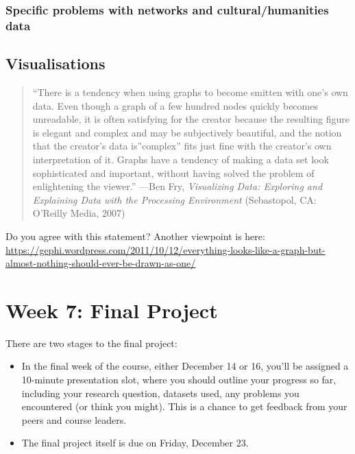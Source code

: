 \documentclass[
]{book}
\begin{document}
\hypertarget{specific-problems-with-networks-and-culturalhumanities-data}{%
\subsection{Specific problems with networks and cultural/humanities data}\label{specific-problems-with-networks-and-culturalhumanities-data}}

\hypertarget{visualisations}{%
\section{Visualisations}\label{visualisations}}

\begin{quote}
``There is a tendency when using graphs to become smitten with one's own data. Even though a graph of a few hundred nodes quickly becomes unreadable, it is often satisfying for the creator because the resulting figure is elegant and complex and may be subjectively beautiful, and the notion that the creator's data is''complex'' fits just fine with the creator's own interpretation of it. Graphs have a tendency of making a data set look sophisticated and important, without having solved the problem of enlightening the viewer.'' ---Ben Fry, \emph{Visualizing Data: Exploring and Explaining Data with the Processing Environment} (Sebastopol, CA: O'Reilly Media, 2007)
\end{quote}

Do you agree with this statement? Another viewpoint is here: \url{https://gephi.wordpress.com/2011/10/12/everything-looks-like-a-graph-but-almost-nothing-should-ever-be-drawn-as-one/}

\hypertarget{week-7-final-project}{%
\chapter{Week 7: Final Project}\label{week-7-final-project}}

There are two stages to the final project:

\begin{itemize}
\item
  In the final week of the course, either December 14 or 16, you'll be assigned a 10-minute presentation slot, where you should outline your progress so far, including your research question, datasets used, any problems you encountered (or think you might). This is a chance to get feedback from your peers and course leaders.
\item
  The final project itself is due on Friday, December 23.
\end{itemize}
\end{document}

